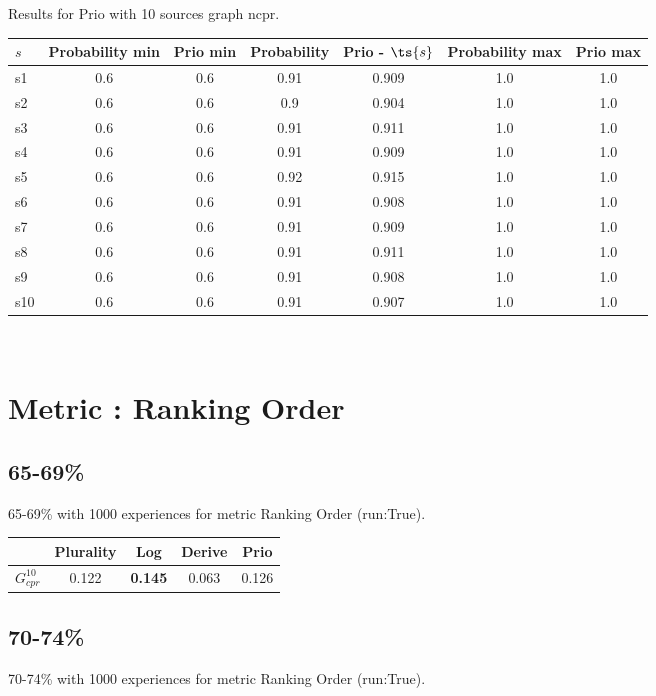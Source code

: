 \documentclass{article}
\newcommand{\graph}[2]{$G_{#1}^{#2}$}
\begin{document}
\noindent Results for Prio with 10 sources graph ncpr.

\noindent\begin{tabular}{|l|c|c|c|c|c|c|}
\hline
$s$& Probability min & Prio min & Probability & Prio - $\ts{s}$ & Probability max & Prio max\\
\hline
s1 &0.6 & 0.6 & 0.91 & 0.909 & 1.0 & 1.0\\
\hline
s2 &0.6 & 0.6 & 0.9 & 0.904 & 1.0 & 1.0\\
\hline
s3 &0.6 & 0.6 & 0.91 & 0.911 & 1.0 & 1.0\\
\hline
s4 &0.6 & 0.6 & 0.91 & 0.909 & 1.0 & 1.0\\
\hline
s5 &0.6 & 0.6 & 0.92 & 0.915 & 1.0 & 1.0\\
\hline
s6 &0.6 & 0.6 & 0.91 & 0.908 & 1.0 & 1.0\\
\hline
s7 &0.6 & 0.6 & 0.91 & 0.909 & 1.0 & 1.0\\
\hline
s8 &0.6 & 0.6 & 0.91 & 0.911 & 1.0 & 1.0\\
\hline
s9 &0.6 & 0.6 & 0.91 & 0.908 & 1.0 & 1.0\\
\hline
s10 &0.6 & 0.6 & 0.91 & 0.907 & 1.0 & 1.0\\
\hline
\end{tabular}\\

\newpage
\section{Metric : Ranking Order}

\newpage

\subsection{65-69\%}

65-69\% with 1000 experiences for metric Ranking Order (run:True).

\noindent\begin{tabular}{|l|c|c|c|c|}
\hline
& Plurality& Log& Derive& Prio\\
\hline
\graph{cpr}{10} &0.122&\textbf{0.145}&0.063&0.126\\
\hline
\end{tabular}
\newpage

\subsection{70-74\%}

70-74\% with 1000 experiences for metric Ranking Order (run:True).
\end{document}
